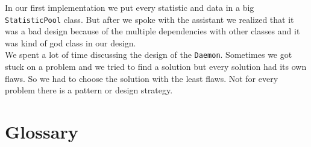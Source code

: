 \documentclass[i2]{oss}
\newcommand{\class}[1]{\texttt{#1}}
\begin{document}
In our first implementation we put every statistic and data in a big \class{StatisticPool} class. But after we spoke with the assistant we realized that it was a bad design because of the multiple dependencies with other classes and it was kind of god class in our design. \\

We spent a lot of time discussing the design of the \class{Daemon}. Sometimes we got stuck on a problem and we tried to find a solution but every solution had its own flaws. So we had to choose the solution with the least flaws. Not for every problem there is a pattern or design strategy. 
\\








\section{Glossary}
\label{ssec:glossary}
\end{document}
